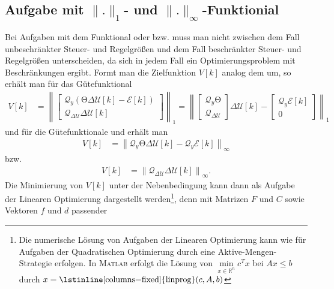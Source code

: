 \subsection{Aufgabe mit $\|.\|_1$- und $\|.\|_{\infty}$-Funktionial}
Bei Aufgaben mit dem Funktional  oder  bzw.  muss
man nicht zwischen dem Fall unbeschränkter Steuer- und Regelgrößen und dem Fall beschränkter Steuer- und Regelgrößen unterscheiden, da sich in jedem Fall ein Optimierungsproblem mit
Beschränkungen ergibt. Formt man die Zielfunktion $V[k]$ analog dem  um, so erhält man für das Gütefunktional
\begin{align}
V[k] & = \left\| \begin{bmatrix}
\mathcal{Q}_y\left( \mathrm{\Theta}\Delta\mathcal{U}[k]-\mathcal{E}[k] \right)\\ \mathcal{Q}_{\Delta\mathcal{U}}\Delta\mathcal{U}[k]
\end{bmatrix} \right\|_1 = \left\| \begin{bmatrix}
\mathcal{Q}_y\mathrm{\Theta}\\ \mathcal{Q}_{\Delta\mathcal{U}}
\end{bmatrix}\Delta\mathcal{U}[k]-\begin{bmatrix}
\mathcal{Q}_y\mathcal{E}[k]\\ 0
\end{bmatrix} \right\|_1
\end{align}
und für die Gütefunktionale  und  erhält man
\begin{align}
	V[k] & = \left\| \mathcal{Q}_y\mathrm{\Theta}\Delta\mathcal{U}[k]-\mathcal{Q}_y\mathcal{E}[k] \right\|_{\infty}
\end{align}
bzw.
\begin{align}
	V[k] & = \left\| \mathcal{Q}_{\Delta\mathcal{U}}\Delta\mathcal{U}[k] \right\|_{\infty}.
\end{align}
Die Minimierung von $V[k]$ unter der Nebenbedingung  kann dann als Aufgabe der Linearen Optimierung dargestellt werden\footnote{Die numerische
Lösung von Aufgaben der Linearen Optimierung kann wie für Aufgaben der Quadratischen Optimierung durch eine Aktive-Mengen-Strategie erfolgen. In \textsc{Matlab} erfolgt die Lösung
von $\min\limits_{x\in\mathbb{R}^n}c^Tx$ bei $Ax\le b$ durch $x=\text{\lstinline[columns=fixed]{linprog}}(c,A,b)$}, denn mit Matrizen $F$ und $C$ sowie Vektoren $f$ und $d$ passender
